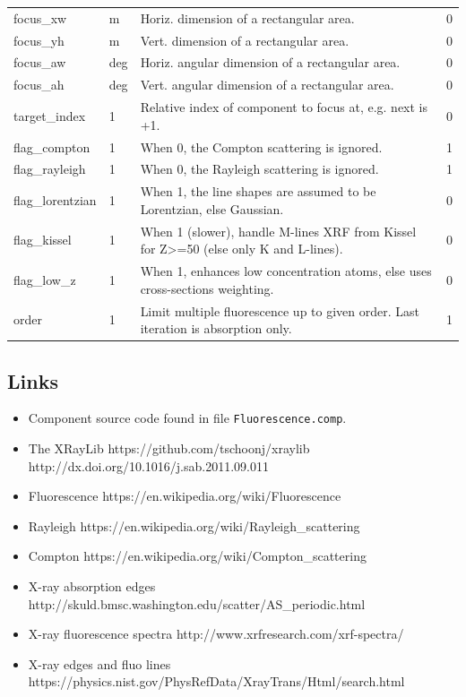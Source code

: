 \begin{longtable}{p{}p{}p{}p{}}
focus\_xw & m & Horiz. dimension of a rectangular area. & 0 \\
focus\_yh & m & Vert.  dimension of a rectangular area. & 0 \\
focus\_aw & deg & Horiz. angular dimension of a rectangular area. & 0 \\
focus\_ah & deg & Vert.  angular dimension of a rectangular area. & 0 \\
target\_index & 1 & Relative index of component to focus at, e.g. next is +1. & 0 \\
flag\_compton & 1 & When 0, the Compton  scattering is ignored. & 1 \\
flag\_rayleigh & 1 & When 0, the Rayleigh scattering is ignored. & 1 \\
flag\_lorentzian & 1 & When 1, the line shapes are assumed to be Lorentzian, else Gaussian. & 0 \\
flag\_kissel & 1 & When 1 (slower), handle M-lines XRF from Kissel for Z\textgreater{}=50 (else only K and L-lines). & 0 \\
flag\_low\_z & 1 & When 1, enhances low concentration atoms, else uses cross-sections weighting. & 0 \\
order & 1 & Limit multiple fluorescence up to given order. Last iteration is absorption only. & 1 \\
\bottomrule
\end{longtable}

\subsection*{Links}
\begin{itemize}
  \item Component source code found in file \texttt{Fluorescence.comp}.
  \item The XRayLib https://github.com/tschoonj/xraylib http://dx.doi.org/10.1016/j.sab.2011.09.011
  \item Fluorescence https://en.wikipedia.org/wiki/Fluorescence
  \item Rayleigh https://en.wikipedia.org/wiki/Rayleigh\_scattering
  \item Compton https://en.wikipedia.org/wiki/Compton\_scattering
  \item X-ray absorption edges http://skuld.bmsc.washington.edu/scatter/AS\_periodic.html
  \item X-ray fluorescence spectra http://www.xrfresearch.com/xrf-spectra/
  \item X-ray edges and fluo lines https://physics.nist.gov/PhysRefData/XrayTrans/Html/search.html
\end{itemize}
